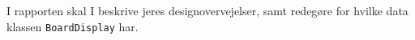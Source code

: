 I rapporten skal I beskrive jeres designovervejelser, samt redegøre
for hvilke data klassen \lstinline{BoardDisplay} har.




